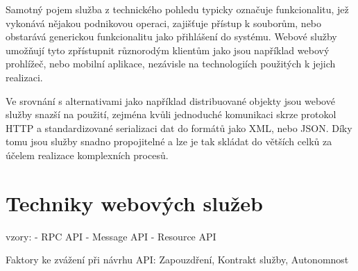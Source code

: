 \documentclass[czech,DP]{thesiskiv}
\begin{document}
Samotný pojem služba z technického pohledu typicky označuje funkcionalitu, jež vykonává nějakou podnikovou operaci, zajišťuje přístup k souborům, nebo obstarává generickou funkcionalitu jako přihlášení do systému. Webové služby umožňují tyto zpřístupnit různorodým klientům jako jsou například webový prohlížeč, nebo mobilní aplikace, nezávisle na technologiích použitých k jejich realizaci.

Ve srovnání s alternativami jako například distribuované objekty jsou webové služby snazší na použití, zejména kvůli jednoduché komunikaci skrze protokol HTTP a standardizované serializaci dat do formátů jako XML, nebo JSON. Díky tomu jsou služby snadno propojitelné a lze je tak skládat do větších celků za účelem realizace komplexních procesů\cite{fromObjectsToWs}.




\section{Techniky webových služeb}


vzory:
- RPC API
- Message API
- Resource API

Faktory ke zvážení při návrhu API\cite{wsApiStyles}: Zapouzdření, Kontrakt služby, Autonomnost 
\end{document}

